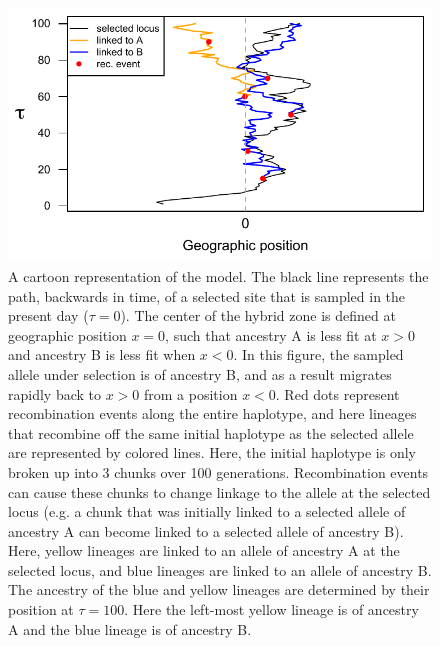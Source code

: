 \documentclass[12pt]{article}
\begin{document}
\begin{figure}
\includegraphics{figs/BM_schematic}
\caption{A cartoon representation of the model. The black line represents the path, backwards in time, of a selected site that is sampled in the present day ($\tau=0$). The center of the hybrid zone is defined at geographic position $x=0$, such that ancestry A is less fit at $x>0$ and ancestry B is less fit when $x<0$. In this figure, the sampled allele under selection is of ancestry B, and as a result migrates rapidly back to $x>0$ from a position $x<0$. Red dots represent recombination events along the entire haplotype, and here lineages that recombine off the same initial haplotype as the selected allele are represented by colored lines. Here, the initial haplotype is only broken up into 3 chunks over 100 generations. Recombination events can cause these chunks to change linkage to the allele at the selected locus (e.g. a chunk that was initially linked to a selected allele of ancestry A can become linked to a selected allele of ancestry B). Here, yellow lineages are linked to an allele of ancestry A at the selected locus, and blue lineages are linked to an allele of ancestry B. The ancestry of the blue and yellow lineages are determined by their position at $\tau=100$. Here the left-most yellow lineage is of ancestry A and the blue lineage is of ancestry B.  }\label{Fig:schematic}
\end{figure}
\end{document}
